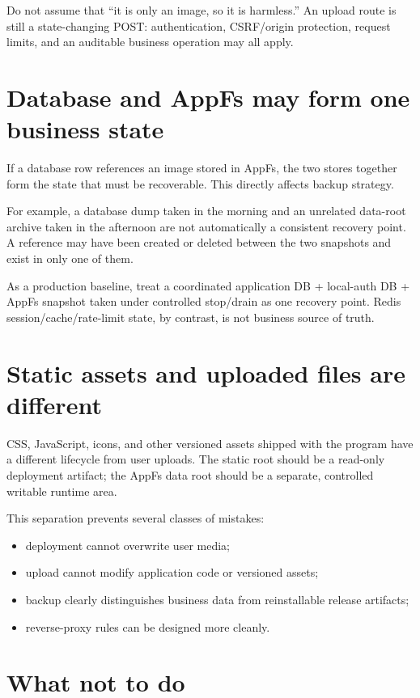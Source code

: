 Do not assume that ``it is only an image, so it is harmless.'' An upload route is still a state-changing POST: authentication, CSRF/origin protection, request limits, and an auditable business operation may all apply.

\section{Database and AppFs may form one business state}

If a database row references an image stored in AppFs, the two stores together form the state that must be recoverable. This directly affects backup strategy.

For example, a database dump taken in the morning and an unrelated data-root archive taken in the afternoon are not automatically a consistent recovery point. A reference may have been created or deleted between the two snapshots and exist in only one of them.

As a production baseline, treat a coordinated application DB + local-auth DB + AppFs snapshot taken under controlled stop/drain as one recovery point. Redis session/cache/rate-limit state, by contrast, is not business source of truth.

\section{Static assets and uploaded files are different}

CSS, JavaScript, icons, and other versioned assets shipped with the program have a different lifecycle from user uploads. The static root should be a read-only deployment artifact; the AppFs data root should be a separate, controlled writable runtime area.

This separation prevents several classes of mistakes:

\begin{itemize}
  \item deployment cannot overwrite user media;
  \item upload cannot modify application code or versioned assets;
  \item backup clearly distinguishes business data from reinstallable release artifacts;
  \item reverse-proxy rules can be designed more cleanly.
\end{itemize}

\section{What not to do}

